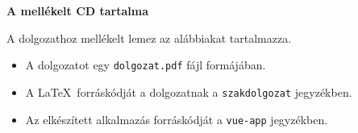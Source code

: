 \pagestyle{empty}

\noindent \textbf{\Large A mellékelt CD tartalma}

\vskip 1cm

\noindent A dolgozathoz mellékelt lemez az alábbiakat tartalmazza.
\begin{itemize}
\item A dolgozatot egy \texttt{dolgozat.pdf} fájl formájában.
\item A \LaTeX\ forráskódját a dolgozatnak a \texttt{szakdolgozat} jegyzékben.
\item Az elkészített alkalmazás forráskódját a \texttt{vue-app} jegyzékben.
\end{itemize}
